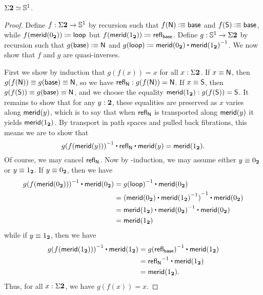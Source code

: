 \begin{lem}\label{thm:suspbool}
  $\Sigma\mathbf{2} \simeq \mathbb{S}^1$.
\end{lem}
\begin{proof}
  Define $f:\Sigma\mathbf{2}\to\mathbb{S}^1$ by recursion such that $f(\mathsf{N})\vcentcolon\equiv \mathsf{base}$ and $f(\mathsf{S})\vcentcolon\equiv\mathsf{base}$, while ${f}\mathopen{}\left({\mathsf{merid}({0_{\mathbf{2}}})}\right)\mathclose{}\coloneqq\mathsf{loop}$ but ${f}\mathopen{}\left({\mathsf{merid}({1_{\mathbf{2}}})}\right)\mathclose{} \coloneqq \mathsf{refl}_{\mathsf{base}}$.
  Define $g:\mathbb{S}^1\to\Sigma\mathbf{2}$ by recursion such that $g(\mathsf{base})\vcentcolon\equiv \mathsf{N}$ and $\ap g \lloop \defid \merid(\bfalse) \ct \opp{\merid(\btrue)}$.
  We now show that $f$ and $g$ are quasi-inverses.

  First we show by induction that $g(f(x))=x$ for all $x:\Sigma \mathbf{2}$.
  If $x\equiv\mathsf{N}$, then $g(f(\mathsf{N})) \equiv g(\mathsf{base})\equiv \mathsf{N}$, so we have $\mathsf{refl}_{\mathsf{N}} : g(f(\mathsf{N}))=\mathsf{N}$.
  If $x\equiv\mathsf{S}$, then $g(f(\mathsf{S})) \equiv g(\mathsf{base})\equiv \mathsf{N}$, and we choose the equality $\mathsf{merid}({1_{\mathbf{2}}}) : g(f(\mathsf{S})) = \mathsf{S}$.
  It remains to show that for any $y:\mathbf{2}$, these equalities are preserved as $x$ varies along $\mathsf{merid}(y)$, which is to say that when $\mathsf{refl}_{\mathsf{N}}$ is transported along $\mathsf{merid}(y)$ it yields $\mathsf{merid}({1_{\mathbf{2}}})$.
  By transport in path spaces and pulled back fibrations, this means we are to show that
  \[ \opp{\ap g {\ap f {\merid(y)}}} \ct \refl{\north} \ct \merid(y) = \merid(\btrue). \]
  Of course, we may cancel $\mathsf{refl}_{\mathsf{N}}$.
  Now by \bool-induction, we may assume either $y\equiv {0_{\ensuremath{\mathbf{2}}}}$ or $y\equiv {1_{\ensuremath{\mathbf{2}}}}$.
  If $y\equiv {0_{\ensuremath{\mathbf{2}}}}$, then we have
  \begin{align*}
    \opp{\ap g {\ap f {\merid(\bfalse)}}} \ct \merid(\bfalse)
    &= \opp{\ap g {\lloop}} \ct \merid(\bfalse)\\
    &= \opp{(\merid(\bfalse) \ct \opp{\merid(\btrue)})} \ct \merid(\bfalse)\\
    &= \merid(\btrue) \ct \opp{\merid(\bfalse)} \ct \merid(\bfalse)\\
    &= \merid(\btrue)
  \end{align*}
  while if $y\equiv {1_{\ensuremath{\mathbf{2}}}}$, then we have
  \begin{align*}
    \opp{\ap g {\ap f {\merid(\btrue)}}} \ct \merid(\btrue)
    &= \opp{\ap g {\refl{\base}}} \ct \merid(\btrue)\\
    &= \opp{\refl{\north}} \ct \merid(\btrue)\\
    &= \merid(\btrue).
  \end{align*}
  Thus, for all $x:\Sigma \mathbf{2}$, we have $g(f(x))=x$.


\end{proof}
